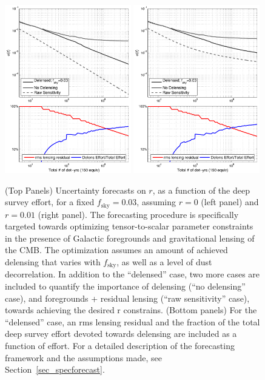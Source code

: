 \begin{figure}[!h]
\centering
\includegraphics[width=0.49\textwidth]{Inflation/sigr_effort_r0.pdf}
\includegraphics[width=0.49\textwidth]{Inflation/sigr_effort_r01.pdf}
\caption{(Top Panels)
Uncertainty forecasts on $r$, as a function of the deep survey effort, for a fixed
$f_\mathrm{sky}=0.03$, assuming $r=0$ (left panel) and $r=0.01$ (right panel).
The forecasting procedure is specifically targeted
towards optimizing tensor-to-scalar parameter constraints in the presence of 
Galactic foregrounds and gravitational lensing of the CMB. The optimization 
assumes an amount of achieved delensing that varies with $f_\mathrm{sky}$, as well as a
level of dust decorrelation. In addition to the ``delensed'' case, two more cases are
 included to quantify the importance of delensing (``no delensing'' case), and
foregrounds + residual lensing (``raw sensitivity'' case), towards achieving the
desired r constrains.
(Bottom panels)
For the ``delensed'' case, an rms lensing residual and the fraction of the total
deep survey effort devoted towards delensing are included as a function of
effort. For a detailed description of the forecasting framework and the
assumptions made, see Section~\ref{sec_specforecast}.}  
\label{fig_rforecast2}
\end{figure}

